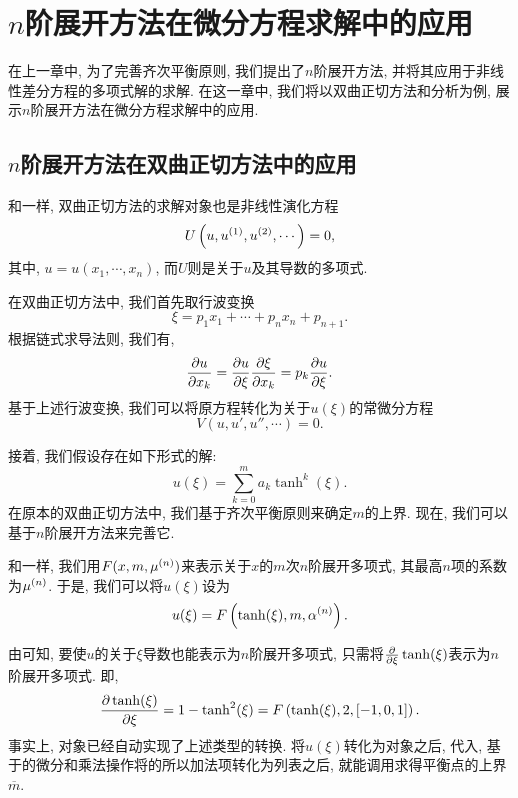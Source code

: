 \chapter{$n$阶展开方法在微分方程求解中的应用}\label{ch05}
在上一章中, 为了完善齐次平衡原则, 我们提出了$n$阶展开方法, 并将其应用于非线性差分方程的多项式解的求解. 在这一章中, 我们将以双曲正切方法和\Painleve{}分析为例, 展示$n$阶展开方法在微分方程求解中的应用.

\section{$n$阶展开方法在双曲正切方法中的应用}
和一样, 双曲正切方法的求解对象也是非线性演化方程
\begin{equation}
    U\left(u,u^{(1)},u^{(2)},\cdots\right)=0,
\end{equation}
其中, $u=u(x_1,\cdots,x_n)$, 而$U$则是关于$u$及其导数的多项式. 

在双曲正切方法中, 我们首先取行波变换 
\begin{equation}
    \xi = p_1 x_1 +\cdots + p_n x_n + p_{n+1}.  \label{tanh-tw}
\end{equation}
根据链式求导法则, 我们有,
\begin{equation}
    \frac{\partial u}{\partial x_k}=\frac{\partial u}{\partial \xi}\frac{\partial \xi}{\partial x_k}=p_k\frac{\partial u}{\partial \xi}.
\end{equation}
基于上述行波变换, 我们可以将原方程转化为关于$u(\xi)$的常微分方程
\begin{equation}
    V(u,u',u'',\cdots)=0. \label{odeq}
\end{equation}

接着, 我们假设存在如下形式的解:
\begin{equation}
    u(\xi)=\sum_{k=0}^m{a_k \tanh^k(\xi)}. \label{tanh-poly}
\end{equation}
在原本的双曲正切方法中, 我们基于齐次平衡原则来确定$m$的上界. 现在, 我们可以基于$n$阶展开方法来完善它. 

和一样, 我们用$F(x,m,\mu^{(n)})$来表示关于$x$的$m$次$n$阶展开多项式, 其最高$n$项的系数为$\mu^{(n)}$. 于是, 我们可以将$u(\xi)$设为
\begin{equation}
    u(\xi)=F\left(\tanh(\xi),m,\alpha^{(n)}\right).
\end{equation}

由可知, 要使$u$的关于$\xi$导数也能表示为$n$阶展开多项式, 只需将$\frac{\partial}{\partial \xi}\tanh(\xi)$表示为$n$阶展开多项式. 即, 
\begin{equation}
    \frac{\partial \tanh(\xi)}{\partial \xi}=1-\tanh^2(\xi)=F\left(\tanh(\xi),2,[-1,0,1]\right).
\end{equation}
事实上, 对象已经自动实现了上述类型的转换. 将$u(\xi)$转化为对象之后, 代入, 基于的微分和乘法操作将的所以加法项转化为列表之后, 就能调用求得平衡点的上界$\overline{m}$.

